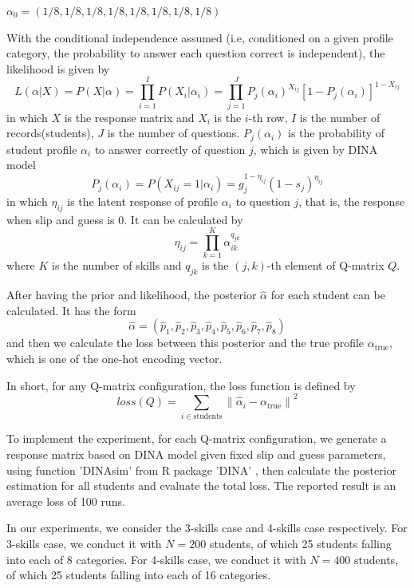 \documentclass{edm_template}
\begin{document}
$\alpha_0=(1/8,1/8,1/8,1/8,1/8,1/8,1/8,1/8)$ 

With the conditional independence assumed (i.e, conditioned on a given profile category, the probability to answer each question correct is independent), the likelihood is given by \cite{de2009dina}
$$ L(\alpha|X) = P(X|\alpha) = \prod_{i=1}^I P(X_i|\alpha_i) = \prod_{j=1}^J P_j(\alpha_i)^{X_{ij}}[1-P_j(\alpha_i)]^{1-X_{ij}}$$
in which $X$ is the response matrix and $X_i$ is the $i$-th row, $I$ is the number of records(students), $J$ is the  number of questions. $P_j(\alpha_i)$ is the probability of student profile $\alpha_i$ to answer correctly of question $j$, which is given by DINA model
$$ P_j(\alpha_i) = P(X_{ij}=1|\alpha_i)=g_j^{1-\eta_{ij}}(1-s_j)^{\eta_{ij}}$$
in which $\eta_{ij}$ is the latent response of profile $\alpha_i$ to question $j$, that is, the response when slip and guess is 0. It can be calculated by 
$$\eta_{ij} = \prod_{k=1}^K \alpha_{ik}^{q_{jk}}$$
where $K$ is the number of skills and $q_{jk}$ is the $(j,k)$-th element of Q-matrix $Q$.

After having the prior and likelihood, the posterior $\hat{\alpha}$ for each student can be calculated. It has the form
$$\hat{\alpha} = (\hat{p}_1,\hat{p}_2,\hat{p}_3,\hat{p}_4,\hat{p}_5,\hat{p}_6,\hat{p}_7,\hat{p}_8)$$ 
and then we calculate the loss between this posterior and the true profile $\alpha_{\mathrm{true}}$, which is one of the one-hot encoding vector. 

In short, for any Q-matrix configuration, the loss function is defined by
\newcommand\norm[1]{\left\lVert#1\right\rVert}
$$ loss(Q) = \sum_{i \in \mathrm{students}} \norm{\hat{\alpha}_i - \alpha_{\mathrm{true}}}^2$$ 

To implement the experiment, for each Q-matrix configuration, we generate a response matrix based on DINA model given fixed slip and guess parameters, using function 'DINAsim' from R package 'DINA' \cite{Culpepper2015}, then calculate the posterior estimation for all students and evaluate the total loss. The reported result is an average loss of 100 runs. 

In our experiments, we consider the 3-skills case and 4-skills case respectively. For 3-skills case, we conduct it with $N=200$ students, of which 25 students falling into each of 8 categories. For 4-skills case, we conduct it with $N=400$ students, of which 25 students falling into each of 16 categories. 

\end{document}
